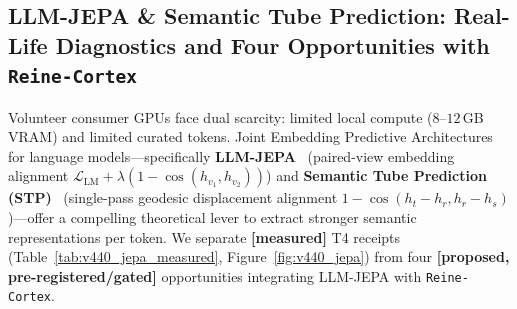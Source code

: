 \documentclass[11pt,a4paper]{article}
\begin{document}
\subsection{LLM-JEPA \& Semantic Tube Prediction: Real-Life Diagnostics and Four Opportunities with \texttt{Reine-Cortex}}
\label{sec:v440_jepa_opportunities}

Volunteer consumer GPUs face dual scarcity: limited local compute ($8\text{--}12$\,GB VRAM) and limited curated tokens. Joint Embedding Predictive Architectures for language models---specifically \textbf{LLM-JEPA}~\cite{huang2025llmjepa} (paired-view embedding alignment $\mathcal{L}_{\mathrm{LM}} + \lambda(1 - \cos(h_{v_1}, h_{v_2}))$) and \textbf{Semantic Tube Prediction (STP)}~\cite{huang2026stp} (single-pass geodesic displacement alignment $1 - \cos(h_t - h_r, h_r - h_s)$)---offer a compelling theoretical lever to extract stronger semantic representations per token. We separate \textbf{[measured]} T4 receipts (Table~\ref{tab:v440_jepa_measured}, Figure~\ref{fig:v440_jepa}) from four \textbf{[proposed, pre-registered/gated]} opportunities integrating LLM-JEPA with \texttt{Reine-Cortex}.
\end{document}
